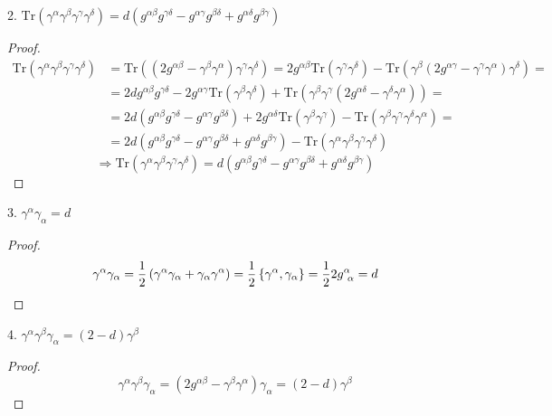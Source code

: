 2. $\mathrm{Tr} \left( \gamma^{\alpha}\gamma^{\beta}\gamma^{\gamma}\gamma^{\delta} \right) = d \left( g^{\alpha\beta}g^{\gamma\delta} - g^{\alpha\gamma}g^{\beta\delta} + g^{\alpha\delta}g^{\beta\gamma} \right)$
\begin{proof}
\begin{align*}
\mathrm{Tr} \left( \gamma^{\alpha}\gamma^{\beta}\gamma^{\gamma}\gamma^{\delta} \right) & = \mathrm{Tr} \left( \left( 2g^{\alpha\beta} - \gamma^{\beta}\gamma^{\alpha} \right) \gamma^{\gamma} \gamma^{\delta} \right) = 2g^{\alpha\beta} \mathrm{Tr} \left( \gamma^{\gamma}\gamma^{\delta}\right) - \mathrm{Tr} \left( \gamma^{\beta} \left( 2g^{\alpha\gamma} - \gamma^{\gamma} \gamma^{\alpha} \right) \gamma^{\delta} \right) = & \\
& = 2d g^{\alpha\beta} g^{\gamma\delta} - 2g^{\alpha\gamma} \mathrm{Tr} \left( \gamma^{\beta}\gamma^{\delta} \right) + \mathrm{Tr} \left( \gamma^{\beta} \gamma^{\gamma} \left( 2g^{\alpha\delta} - \gamma^{\delta}\gamma^{\alpha} \right) \right) = & \\
& = 2d \left( g^{\alpha\beta} g^{\gamma\delta} - g^{\alpha\gamma} g^{\beta\delta} \right) + 2g^{\alpha\delta} \mathrm{Tr} \left( \gamma^{\beta}\gamma^{\gamma} \right) - \mathrm{Tr} \left( \gamma^{\beta}\gamma^{\gamma}\gamma^{\delta}\gamma^{\alpha} \right) = & \\
& = 2d \left( g^{\alpha\beta} g^{\gamma\delta} - g^{\alpha\gamma}g^{\beta\delta} + g^{\alpha\delta} g^{\beta\gamma} \right) - \mathrm{Tr} \left( \gamma^{\alpha}\gamma^{\beta}\gamma^{\gamma}\gamma^{\delta} \right) & 
\end{align*}
\begin{equation*}
\Rightarrow \mathrm{Tr} \left( \gamma^{\alpha}\gamma^{\beta}\gamma^{\gamma}\gamma^{\delta} \right) = d \left( g^{\alpha\beta}g^{\gamma\delta} - g^{\alpha\gamma}g^{\beta\delta} + g^{\alpha\delta}g^{\beta\gamma} \right)
\end{equation*}
\end{proof}


3. $\gamma^{\alpha}\gamma_{\alpha} = d$
\begin{proof}
\begin{equation*}
\gamma^{\alpha}\gamma_{\alpha} = \frac{1}{2} \left( \gamma^{\alpha}\gamma_{\alpha} + \gamma_{\alpha}\gamma^{\alpha} \right) = \frac{1}{2} \left\lbrace \gamma^{\alpha}, \gamma_{\alpha} \right\rbrace = \frac{1}{2} 2 g^{\alpha}_{ \ \alpha} = d
\end{equation*}
\end{proof}

4. $\gamma^{\alpha}\gamma^{\beta}\gamma_{\alpha} = \left( 2-d \right) \gamma^{\beta}$
\begin{proof}
\begin{equation*}
\gamma^{\alpha}\gamma^{\beta}\gamma_{\alpha} = \left( 2g^{\alpha\beta} - \gamma^{\beta}\gamma^{\alpha} \right) \gamma_{\alpha} = \left( 2-d \right) \gamma^{\beta}
\end{equation*}
\end{proof}

